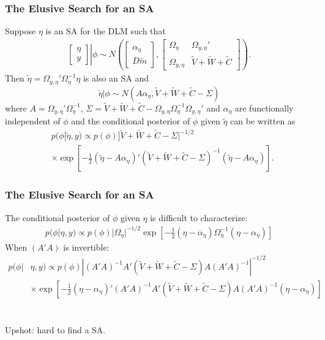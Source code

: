 \documentclass[xcolor=dvipsnames]{beamer}
\begin{document}
\begin{frame}
\frametitle{The Elusive Search for an SA}
Suppose $\eta$ is an SA for the DLM such that
\begin{align*}
 \left. \begin{bmatrix}\eta \\ y \end{bmatrix}\right|\phi \sim N\left(\begin{bmatrix} \alpha_\eta \\ D\tilde{m} \end{bmatrix}, \begin{bmatrix}
   \Omega_\eta & \Omega_{y,\eta}' \\
   \Omega_{y,\eta} & \tilde{V} + \tilde{W} + \tilde{C} \end{bmatrix}\right).
\end{align*}
Then $\tilde{\eta}=\Omega_{y,\eta}'\Omega_{\eta}^{-1}\eta$ is also an SA and
\[
\tilde{\eta}|\phi \sim N(A\alpha_{\eta},\tilde{V} + \tilde{W} + \tilde{C} - \Sigma)
\]
where $A=\Omega_{y,\eta}'\Omega_{\eta}^{-1}$, $\Sigma = \tilde{V} + \tilde{W} + \tilde{C} - \Omega_{y,\eta}\Omega_{\eta}^{-1}\Omega_{y,\eta}'$ and $\alpha_{\eta}$ are functionally independent of $\phi$ and the conditional posterior of $\phi$ given $\tilde{\eta}$ can be written as
\begin{align*}
&p(\phi|\tilde{\eta},y) \propto p(\phi)|\tilde{V} + \tilde{W} + \tilde{C} - \Sigma|^{-1/2}\\
&\times \exp\left[-\frac{1}{2}(\tilde{\eta} - A\alpha_{\eta})'(\tilde{V} + \tilde{W} + \tilde{C} - \Sigma)^{-1}(\tilde{\eta} - A\alpha_{\eta})\right].
\end{align*}
\end{frame}

\begin{frame}
\frametitle{The Elusive Search for an SA}
The conditional posterior of $\phi$ given $\eta$ is difficult to characterize:
\begin{align*}
p(\phi|\eta,y) \propto  p(\phi) |\Omega_{\eta}|^{-1/2}\exp\left[-\frac{1}{2}(\eta-\alpha_{\eta})\Omega_{\eta}^{-1}(\eta-\alpha_{\eta})\right]
\end{align*}
When $(A'A)$ is invertible:
\begin{align*}
p(\phi|&\eta,y) \propto p(\phi) |(A'A)^{-1}A'(\tilde{V} + \tilde{W} + \tilde{C} - \Sigma)A(A'A)^{-1}|^{-1/2}\\
&\times \exp\left[-\frac{1}{2}(\eta - \alpha_{\eta})'(A'A)^{-1}A'(\tilde{V} + \tilde{W} + \tilde{C} - \Sigma)A(A'A)^{-1}(\eta - \alpha_\eta)\right]
\end{align*}
\\~\\
Upshot: hard to find a SA.

\end{frame}
\end{document}
